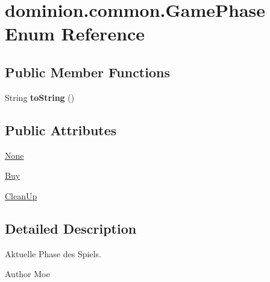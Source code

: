 \hypertarget{enumdominion_1_1common_1_1GamePhase}{\section{dominion.\-common.\-Game\-Phase \-Enum \-Reference}
\label{enumdominion_1_1common_1_1GamePhase}
}
\subsection*{\-Public \-Member \-Functions}
\begin{DoxyCompactItemize}
\item 
\hypertarget{enumdominion_1_1common_1_1GamePhase_a8eb7c137d9269dddbc71fe5b70dad89b}{\-String {\bfseries to\-String} ()}\label{enumdominion_1_1common_1_1GamePhase_a8eb7c137d9269dddbc71fe5b70dad89b}

\end{DoxyCompactItemize}
\subsection*{\-Public \-Attributes}
\begin{DoxyCompactItemize}
\item 
\hyperlink{enumdominion_1_1common_1_1GamePhase_aaba471fc5657c8579b51322c9f03dc72}{\-None}
\item 
\hyperlink{enumdominion_1_1common_1_1GamePhase_ad567ac6ff14860ffc74695488af68331}{\-Buy}
\item 
\hyperlink{enumdominion_1_1common_1_1GamePhase_ae85d692de30853312cab6c1d88b2b7f2}{\-Clean\-Up}
\end{DoxyCompactItemize}


\subsection{\-Detailed \-Description}
\-Aktuelle \-Phase des \-Spiels.

\begin{DoxyAuthor}{\-Author}
\-Moe 
\end{DoxyAuthor}


